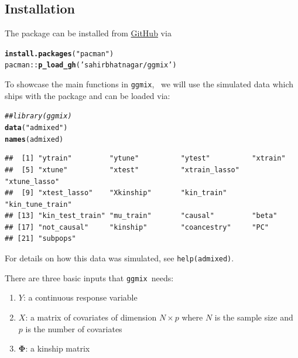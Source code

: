 \documentclass[12pt,letter]{article}\usepackage[]{graphicx}\usepackage[]{color}
\makeatletter
\newcommand{\hlstr}[1]{\textcolor[rgb]{0.192,0.494,0.8}{#1}}%
\newcommand{\hlcom}[1]{\textcolor[rgb]{0.678,0.584,0.686}{\textit{#1}}}%
\newcommand{\hlopt}[1]{\textcolor[rgb]{0,0,0}{#1}}%
\newcommand{\hlstd}[1]{\textcolor[rgb]{0.345,0.345,0.345}{#1}}%
\newcommand{\hlkwd}[1]{\textcolor[rgb]{0.737,0.353,0.396}{\textbf{#1}}}%
\newenvironment{kframe}{%
 \def\at@end@of@kframe{}%
 \ifinner\ifhmode%
  \def\at@end@of@kframe{\end{minipage}}%
  \begin{minipage}{\columnwidth}%
 \fi\fi%
 \def\FrameCommand##1{\hskip\@totalleftmargin \hskip-\fboxsep
 \colorbox{shadecolor}{##1}\hskip-\fboxsep
     \hskip-\linewidth \hskip-\@totalleftmargin \hskip\columnwidth}%
 \MakeFramed {\advance\hsize-\width
   \@totalleftmargin\z@ \linewidth\hsize
   \@setminipage}}%
 {\par\unskip\endMakeFramed%
 \at@end@of@kframe}
\newenvironment{knitrout}{}{} %
\newcommand{\ggmix}{\texttt{ggmix}}
\makeatother
\begin{document}
\subsection{Installation}

The package can be installed from \href{https://github.com/sahirbhatnagar/ggmix}{GitHub} via


\begin{knitrout}\scriptsize
{}\color{fgcolor}\begin{kframe}
\begin{alltt}
\hlkwd{install.packages}\hlstd{(}\hlstr{"pacman"}\hlstd{)}
\hlstd{pacman}\hlopt{::}\hlkwd{p_load_gh}\hlstd{(}\hlstr{'sahirbhatnagar/ggmix'}\hlstd{)}
\end{alltt}
\end{kframe}
\end{knitrout}

To showcase the main functions in \ggmix, ~we will use the simulated data which ships with the package and can be loaded via:

\begin{knitrout}\scriptsize
{}\color{fgcolor}\begin{kframe}
\begin{alltt}
\hlcom{## library(ggmix)}
\hlkwd{data}\hlstd{(}\hlstr{"admixed"}\hlstd{)}
\hlkwd{names}\hlstd{(admixed)}
\end{alltt}
\begin{verbatim}
##  [1] "ytrain"         "ytune"          "ytest"          "xtrain"        
##  [5] "xtune"          "xtest"          "xtrain_lasso"   "xtune_lasso"   
##  [9] "xtest_lasso"    "Xkinship"       "kin_train"      "kin_tune_train"
## [13] "kin_test_train" "mu_train"       "causal"         "beta"          
## [17] "not_causal"     "kinship"        "coancestry"     "PC"            
## [21] "subpops"
\end{verbatim}
\end{kframe}
\end{knitrout}

For details on how this data was simulated, see \texttt{help(admixed)}.

There are three basic inputs that \ggmix ~needs:
\begin{enumerate}
	\item $Y$: a continuous response variable
\item $X$: a matrix of covariates of dimension $N \times p$ where $N$ is the sample size and $p$ is the number of covariates
\item $\boldsymbol{\Phi}$: a kinship matrix
\end{enumerate}
\end{document}

